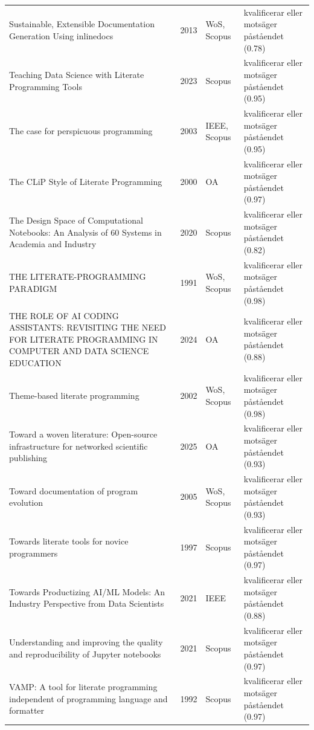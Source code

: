 \begin{longtable}{@{}%
  >{\raggedright\arraybackslash}p{}c%
  >{\raggedright\arraybackslash}p{}%
  >{\raggedright\arraybackslash}p{}@{}}
Sustainable, Extensible Documentation Generation Using inlinedocs & 2013 & WoS, Scopus & kvalificerar eller motsäger påståendet (0.78) \\
Teaching Data Science with Literate Programming Tools & 2023 & Scopus & kvalificerar eller motsäger påståendet (0.95) \\
The case for perspicuous programming & 2003 & IEEE, Scopus & kvalificerar eller motsäger påståendet (0.95) \\
The CLiP Style of Literate Programming & 2000 & OA & kvalificerar eller motsäger påståendet (0.97) \\
The Design Space of Computational Notebooks: An Analysis of 60 Systems in Academia and Industry & 2020 & Scopus & kvalificerar eller motsäger påståendet (0.82) \\
THE LITERATE-PROGRAMMING PARADIGM & 1991 & WoS, Scopus & kvalificerar eller motsäger påståendet (0.98) \\
THE ROLE OF AI CODING ASSISTANTS: REVISITING THE NEED FOR LITERATE PROGRAMMING IN COMPUTER AND DATA SCIENCE EDUCATION & 2024 & OA & kvalificerar eller motsäger påståendet (0.88) \\
Theme-based literate programming & 2002 & WoS, Scopus & kvalificerar eller motsäger påståendet (0.98) \\
Toward a woven literature: Open-source infrastructure for networked scientific publishing & 2025 & OA & kvalificerar eller motsäger påståendet (0.93) \\
Toward documentation of program evolution & 2005 & WoS, Scopus & kvalificerar eller motsäger påståendet (0.93) \\
Towards literate tools for novice programmers & 1997 & Scopus & kvalificerar eller motsäger påståendet (0.97) \\
Towards Productizing AI/ML Models: An Industry Perspective from Data Scientists & 2021 & IEEE & kvalificerar eller motsäger påståendet (0.88) \\
Understanding and improving the quality and reproducibility of Jupyter notebooks & 2021 & Scopus & kvalificerar eller motsäger påståendet (0.97) \\
VAMP: A tool for literate programming independent of programming language and formatter & 1992 & Scopus & kvalificerar eller motsäger påståendet (0.97) \\
\end{longtable}
\endgroup
